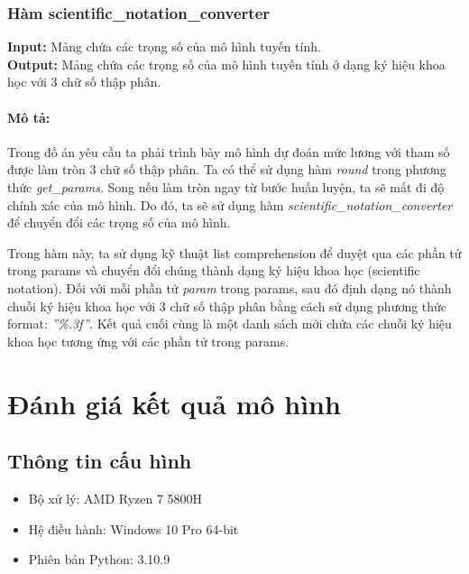 \documentclass[]{article}
\begin{document}
\subsubsection{Hàm scientific\_notation\_converter}
\noindent
\textbf{Input:} Mảng chứa các trọng số của mô hình tuyến tính. \\
\textbf{Output:} Mảng chứa các trọng số của mô hình tuyến tính ở dạng ký hiệu khoa học với 3 chữ số thập phân.
\paragraph{Mô tả:}

Trong đồ án yêu cầu ta phải trình bày mô hình dự đoán mức lương với tham số được làm tròn 3 chữ số thập phân. Ta có thể sử dụng hàm \textit{round} trong phương thức \textit{get\_params}. Song nếu làm tròn ngay từ bước huấn luyện, ta sẽ mất đi độ chính xác của mô hình. Do đó, ta sẽ sử dụng hàm \textit{scientific\_notation\_converter} để chuyển đổi các trọng số của mô hình.

Trong hàm này, ta sử dụng kỹ thuật list comprehension để duyệt qua các phần tử trong params và chuyển đổi chúng thành dạng ký hiệu khoa học (scientific notation). Đối với mỗi phần tử \textit{param} trong params, sau đó định dạng nó thành chuỗi ký hiệu khoa học với 3 chữ số thập phân bằng cách sử dụng phương thức format: \textit{''\%.3f''}. Kết quả cuối cùng là một danh sách mới chứa các chuỗi ký hiệu khoa học tương ứng với các phần tử trong params.

\section{Đánh giá kết quả mô hình}
\subsection{Thông tin cấu hình}
\begin{itemize}
  \item Bộ xử lý: AMD Ryzen 7 5800H
  \item Hệ điều hành: Windows 10 Pro 64-bit
  \item Phiên bản Python: 3.10.9
\end{itemize}
\end{document}
